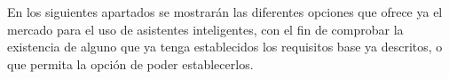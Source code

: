 En los siguientes apartados se mostrarán las diferentes opciones que ofrece ya el mercado para el uso de asistentes inteligentes, con el fin de comprobar la existencia de alguno que ya tenga establecidos los requisitos base ya descritos, o que permita la opción de poder establecerlos.